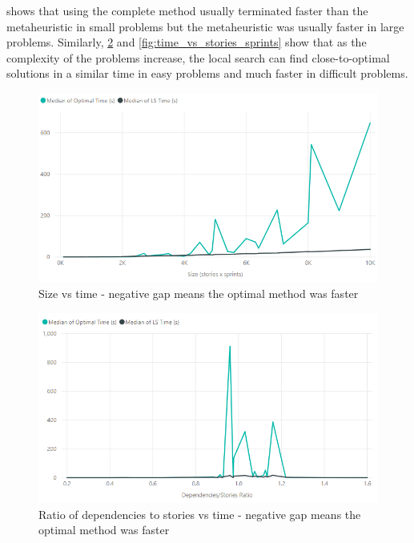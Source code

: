 \FloatBarrier

 shows that using the complete method usually terminated faster than the metaheuristic in small problems but the metaheuristic was usually faster in large problems. Similarly, \cref{fig:time_vs_dependencies_stories} and \cref{fig:time_vs_stories_sprints} show that as the complexity of the problems increase, the local search can find close-to-optimal solutions in a similar time in easy problems and much faster in difficult problems.

\begin{figure}[h!]
    \centering
    \includegraphics[width=\textwidth]{Figures/FinalResults/annealing_time_size.png}
     \caption{Size vs time - negative gap means the optimal method was faster}
     \label{fig:time_vs_size}
\end{figure}

\begin{figure}[h!]
    \centering
    \includegraphics[width=\textwidth]{Figures/FinalResults/annealing_time_dependencies_stories.png}
     \caption{Ratio of dependencies to stories vs time - negative gap means the optimal method was faster}
     \label{fig:time_vs_dependencies_stories}
\end{figure}


